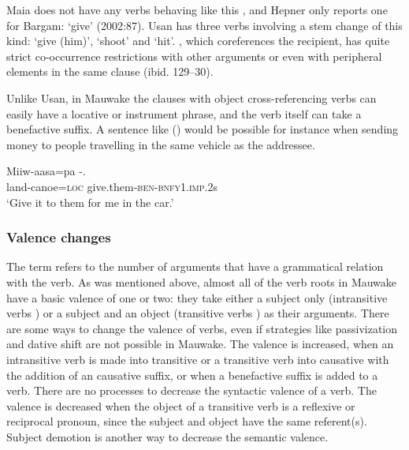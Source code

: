 Maia does not have any verbs behaving like this \citep{Hardin2002}, and Hepner only reports one for Bargam:  `give' (2002:87). Usan has three verbs involving a stem change of this kind:  `give (him)',  `shoot' and  `hit'\citep[44]{Reesink1987}. , which coreferences the recipient, has quite strict co-occurrence restrictions with other arguments or even with peripheral elements in the same clause (ibid. 129--30). 

Unlike Usan, in Mauwake the clauses with object cross-referencing verbs can easily have a locative or instrument phrase, and the verb itself can take a benefactive suffix. A sentence like () would be possible for instance when sending money to people travelling in the same vehicle as the addressee. 

\ea%
\label{ex:x338}
\gll Miiw-aasa=pa -. \\
land-canoe=\textsc{loc} give.them-\textsc{ben}-\textsc{bnfy}1.\textsc{imp}.2s \\
\glt`Give it to them for me in the car.'
\z

\subsubsection[Valence changes]{Valence changes}
{}
The term  refers to the number of arguments that have a grammatical relation with the verb. As was mentioned above, almost all of the verb roots in Mauwake have a basic valence of one or two: they take either a subject only (intransitive verbs ) or a subject and an object (transitive verbs ) as their arguments. There are some ways to change the valence of verbs, even if strategies like passivization and dative shift are not possible in Mauwake. The valence is increased, when an intransitive verb is made into transitive or a transitive verb into causative with the addition of an causative suffix, or when a benefactive suffix is added to a verb. There are no processes to decrease the syntactic valence of a verb. The  valence is decreased when the object of a transitive verb is a reflexive or reciprocal pronoun, since the subject and object have the same referent(s). Subject demotion is another way to decrease the semantic valence. 

